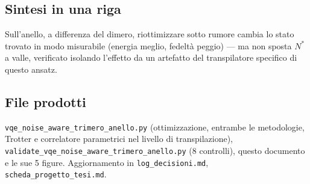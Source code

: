 \documentclass[11pt,a4paper]{article}
\begin{document}
\subsection*{Sintesi in una riga}
Sull'anello, a differenza del dimero, riottimizzare sotto rumore cambia lo stato trovato in modo
misurabile (energia meglio, fedeltà peggio) --- ma non sposta $N^*$ a valle, verificato isolando
l'effetto da un artefatto del transpilatore specifico di questo ansatz.

\subsection*{File prodotti}
\texttt{vqe\_noise\_aware\_\allowbreak trimero\_anello.py} (ottimizzazione, entrambe le
metodologie, Trotter e correlatore parametrici nel livello di transpilazione),
\texttt{validate\_vqe\_noise\_aware\_\allowbreak trimero\_anello.py} (8 controlli), questo
documento e le sue 5 figure. Aggiornamento in \texttt{log\_decisioni.md},
\texttt{scheda\_progetto\_tesi.md}.
\end{document}
